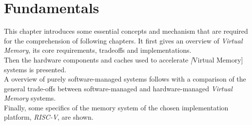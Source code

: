 \chapter{Fundamentals} %
\label{chap:fund}

%



This chapter introduces some essential concepts and mechanism that are required for the comprehension
of following chapters. It first gives an overview of \textit{Virtual Memory}, its core requirements,
tradeoffs and implementations.\\
Then the hardware components and caches used to accelerate \textit[Virtual Memory] systems is
presented.\\
A overview of purely software-managed systems follows with a comparison of the general trade-offs
between software-managed and hardware-managed \textit{Virtual Memory} systems.\\
Finally, some specifics of the memory system of the chosen implementation platform, \textit{RISC-V},
are shown.

